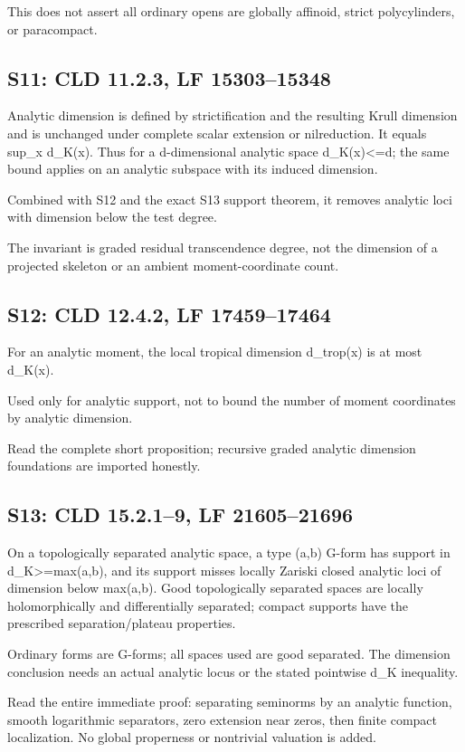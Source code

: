 \documentclass[11pt]{article}
\begin{document}
This does not assert all ordinary opens are globally affinoid, strict polycylinders, or paracompact.

\subsection*{S11: CLD 11.2.3, LF 15303--15348}

Analytic dimension is defined by strictification and the resulting Krull dimension and is unchanged under complete scalar extension or nilreduction. It equals sup\_x d\_K(x). Thus for a d-dimensional analytic space d\_K(x)<=d; the same bound applies on an analytic subspace with its induced dimension.

Combined with S12 and the exact S13 support theorem, it removes analytic loci with dimension below the test degree.

The invariant is graded residual transcendence degree, not the dimension of a projected skeleton or an ambient moment-coordinate count.

\subsection*{S12: CLD 12.4.2, LF 17459--17464}

For an analytic moment, the local tropical dimension d\_trop(x) is at most d\_K(x).

Used only for analytic support, not to bound the number of moment coordinates by analytic dimension.

Read the complete short proposition; recursive graded analytic dimension foundations are imported honestly.

\subsection*{S13: CLD 15.2.1--9, LF 21605--21696}

On a topologically separated analytic space, a type (a,b) G-form has support in d\_K>=max(a,b), and its support misses locally Zariski closed analytic loci of dimension below max(a,b). Good topologically separated spaces are locally holomorphically and differentially separated; compact supports have the prescribed separation/plateau properties.

Ordinary forms are G-forms; all spaces used are good separated. The dimension conclusion needs an actual analytic locus or the stated pointwise d\_K inequality.

Read the entire immediate proof: separating seminorms by an analytic function, smooth logarithmic separators, zero extension near zeros, then finite compact localization. No global properness or nontrivial valuation is added.
\end{document}
